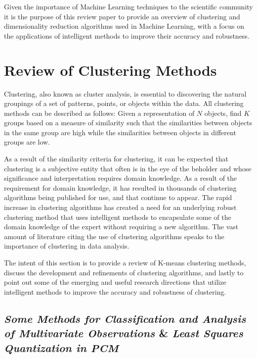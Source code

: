 \documentclass{article}
\begin{document}
Given the importance of Machine Learning techniques to the scientific community it is the purpose of this review paper to provide an overview of clustering and dimensionality reduction algorithms used in Machine Learning, with a focus on the applications of intelligent methods to improve their accuracy and robustness.







\section{Review of Clustering Methods}

Clustering, also known as cluster analysis, is essential to discovering the natural groupings of a set of patterns, points, or objects within the data. All clustering methods can be described as follows: 
Given a representation of $N$ objects, find $K$ groups based on a measure of similarity such that the similarities between objects in the same group are high while the similarities between objects in different groups are low\cite{jain2010}.

As a result of the similarity criteria for clustering, it can be expected that clustering is a subjective entity that often is in the eye of the beholder and whose significance and interpretation requires domain knowledge. As a result of the requirement for domain knowledge, it has resulted in thousands of clustering algorithms being published for use, and that continue to appear\cite{jain2010}. The rapid increase in clustering algorithms has created a need for an underlying robust clustering method that uses intelligent methods to encapsulate some of the domain knowledge of the expert without requiring a new algorithm. The vast amount of literature citing the use of clustering algorithms speaks to the importance of clustering in data analysis. 

The intent of this section is to provide a review of K-means clustering methods, discuss the development and refinements of clustering algorithms, and lastly to point out some of the emerging and useful research directions that utilize intelligent methods to improve the accuracy and robustness of clustering.




\subsection{\emph{Some Methods for Classification and Analysis of Multivariate Observations} \& \emph{Least Squares Quantization in PCM}}
\end{document}
